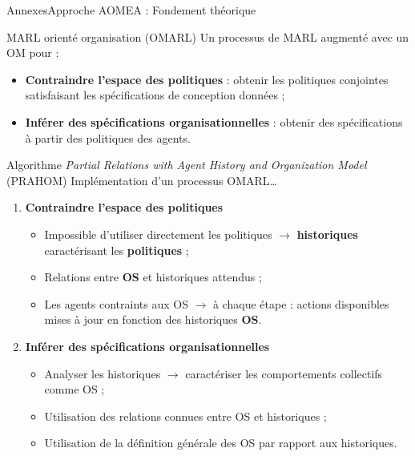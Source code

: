 \begin{frame}[allowframebreaks]{Annexes}{Approche AOMEA : Fondement théorique}
    \begin{block}{MARL orienté organisation (OMARL)}
        Un processus de MARL augmenté avec un OM pour :
        \begin{itemize}
            \item \textbf{Contraindre l'espace des politiques} : obtenir les politiques conjointes satisfaisant les spécifications de conception données ;
            \item \textbf{Inférer des spécifications organisationnelles} : obtenir des spécifications à partir des politiques des agents.
        \end{itemize}
    \end{block}
    
    \begin{block}{Algorithme \emph{Partial Relations with Agent History and Organization Model} (PRAHOM)}
        Implémentation d'un processus OMARL\dots
        \begin{enumerate}
            \item \textbf{Contraindre l'espace des politiques}
                  \begin{itemize}
                      \item Impossible d'utiliser directement les politiques $\rightarrow$ \textbf{historiques} caractérisant les \textbf{politiques} ;
                      \item Relations entre \textbf{OS} et historiques attendus ;
                      \item Les agents contraints aux OS $\rightarrow$ à chaque étape : actions disponibles mises à jour en fonction des historiques \textbf{OS}.
                  \end{itemize}
    
            \item \textbf{Inférer des spécifications organisationnelles}
                  \begin{itemize}
                      \item Analyser les historiques $\rightarrow$ caractériser les comportements collectifs comme OS ;
                      \item Utilisation des relations connues entre OS et historiques ;
                      \item Utilisation de la définition générale des OS par rapport aux historiques.
                  \end{itemize}
        \end{enumerate}
    \end{block}
    
\end{frame}

